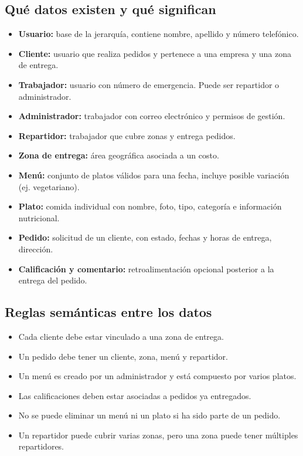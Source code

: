 \documentclass[12pt,a4paper]{article}
\begin{document}
\subsection{Qué datos existen y qué significan}
\begin{itemize}
  \item \textbf{Usuario:} base de la jerarquía, contiene nombre, apellido y número telefónico.
  \item \textbf{Cliente:} usuario que realiza pedidos y pertenece a una empresa y una zona de entrega.
  \item \textbf{Trabajador:} usuario con número de emergencia. Puede ser repartidor o administrador.
  \item \textbf{Administrador:} trabajador con correo electrónico y permisos de gestión.
  \item \textbf{Repartidor:} trabajador que cubre zonas y entrega pedidos.
  \item \textbf{Zona de entrega:} área geográfica asociada a un costo.
  \item \textbf{Menú:} conjunto de platos válidos para una fecha, incluye posible variación (ej. vegetariano).
  \item \textbf{Plato:} comida individual con nombre, foto, tipo, categoría e información nutricional.
  \item \textbf{Pedido:} solicitud de un cliente, con estado, fechas y horas de entrega, dirección.
  \item \textbf{Calificación y comentario:} retroalimentación opcional posterior a la entrega del pedido.
\end{itemize}

\subsection{Reglas semánticas entre los datos}
\begin{itemize}
  \item Cada cliente debe estar vinculado a una zona de entrega.
  \item Un pedido debe tener un cliente, zona, menú y repartidor.
  \item Un menú es creado por un administrador y está compuesto por varios platos.
  \item Las calificaciones deben estar asociadas a pedidos ya entregados.
  \item No se puede eliminar un menú ni un plato si ha sido parte de un pedido.
  \item Un repartidor puede cubrir varias zonas, pero una zona puede tener múltiples repartidores.
\end{itemize}
\end{document}
